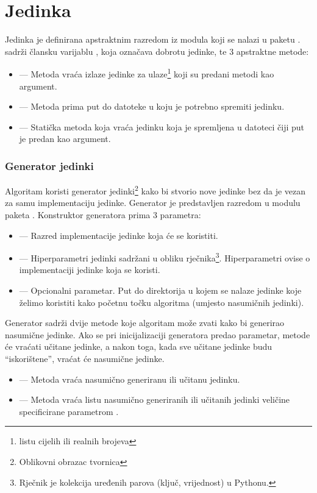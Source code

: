 \documentclass[times, utf8, zavrsni, numeric]{fer}
\begin{document}
\section{Jedinka}
Jedinka je definirana apstraktnim razredom  iz modula
 koji se nalazi u paketu .
 sadrži člansku varijablu , koja označava
dobrotu jedinke, te 3 apstraktne metode:
\begin{itemize}
    \item {} --- Metoda vraća izlaze jedinke za
        ulaze\footnote{listu cijelih ili realnih brojeva} koji su predani metodi
        kao argument.
    \item {} --- Metoda prima put do datoteke u koju je potrebno
        spremiti jedinku.
    \item {} --- Statička metoda koja vraća jedinku koja je
        spremljena u datoteci čiji put je predan kao argument.
\end{itemize}

\subsubsection{Generator jedinki}
Algoritam koristi generator jedinki\footnote{Oblikovni obrazac tvornica} kako bi
stvorio nove jedinke bez da je vezan za samu implementaciju jedinke. Generator
je predstavljen razredom  u modulu
 paketa . Konstruktor generatora prima 3
parametra:
\begin{itemize}
    \item {} --- Razred implementacije jedinke koja će
        se koristiti.
    \item {} --- Hiperparametri jedinki sadržani u obliku
        rječnika\footnote{Rječnik  je kolekcija uređenih parova
        (ključ, vrijednost) u Pythonu.}. Hiperparametri ovise o implementaciji
        jedinke koja se koristi. 
    \item {} --- Opcionalni parametar. Put do direktorija
        u kojem se nalaze jedinke koje želimo koristiti kako početnu točku
        algoritma (umjesto nasumičnih jedinki).
\end{itemize}
Generator sadrži dvije metode koje algoritam može zvati kako bi generirao
nasumične jedinke. Ako se pri inicijalizaciji generatora predao
 parametar, metode će vraćati učitane jedinke, a nakon
toga, kada sve učitane jedinke budu ``iskorištene'', vraćat će nasumične
jedinke.
\begin{itemize}
    \item {} --- Metoda vraća nasumično generiranu ili učitanu
        jedinku.
    \item {} --- Metoda vraća listu nasumično generiranih
        ili učitanih jedinki veličine specificirane parametrom
        .
\end{itemize}
\end{document}
